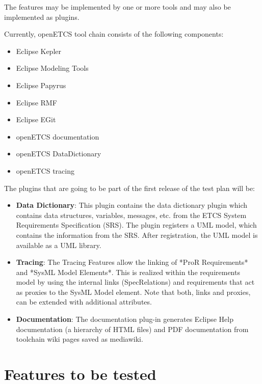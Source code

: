 The features may be implemented by one or more tools and may also be implemented as plugins.

Currently, openETCS tool chain consists of the following components:
\begin{itemize}
\item Eclipse Kepler
\item Eclipse Modeling Tools
\item Eclipse Papyrus
\item Eclipse RMF
\item Eclipse EGit
\item openETCS documentation
\item openETCS DataDictionary 
\item openETCS tracing
\end{itemize}

The plugins that are going to be part of the first release of the test plan will be:
\begin{itemize}
\item \textbf{Data Dictionary}: This plugin contains the data dictionary plugin which contains data structures, variables, messages, etc. from the ETCS System Requirements Specification (SRS). The plugin registers a UML model, which contains the information from the SRS. After registration, the UML model is available as a UML library.
\item \textbf{Tracing}: The Tracing Features allow the linking of *ProR Requirements* and *SysML Model Elements*. This is realized within the requirements model by using the internal links (SpecRelations) and requirements that act as proxies to the SysML Model element. Note that both, links and proxies, can be extended with additional attributes.
\item \textbf{Documentation}: The documentation plug-in generates Eclipse Help documentation (a hierarchy of HTML files) and PDF documentation from toolchain wiki pages saved as mediawiki.
\end{itemize}

\section{Features to be tested}
\label{sec:features_test}

